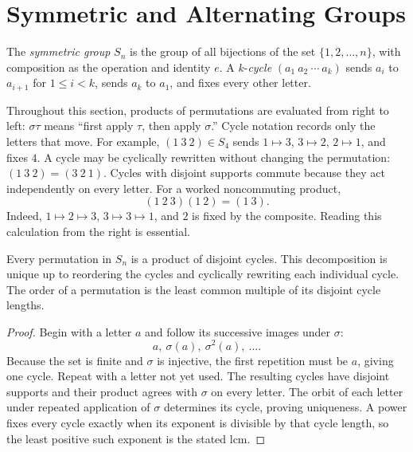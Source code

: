 \section{Symmetric and Alternating Groups}

\begin{definition}
The \emph{symmetric group} \(S_n\) is the group of all bijections of the set
\(\{1,2,\ldots,n\}\), with composition as the operation and identity \(e\).
A \(k\)-\emph{cycle}
\((a_1\ a_2\ \cdots\ a_k)\) sends \(a_i\) to \(a_{i+1}\) for
\(1\leq i<k\), sends \(a_k\) to \(a_1\), and fixes every other letter.
\end{definition}

Throughout this section, products of permutations are evaluated from right to
left: \(\sigma\tau\) means ``first apply \(\tau\), then apply \(\sigma\).''
Cycle notation records only the letters that move.  For example,
\((1\ 3\ 2)\in S_4\) sends \(1\mapsto3\), \(3\mapsto2\),
\(2\mapsto1\), and fixes \(4\).  A cycle may be cyclically rewritten without
changing the permutation: \((1\ 3\ 2)=(3\ 2\ 1)\).  Cycles with disjoint
supports commute because they act independently on every letter.  For a
worked noncommuting product,
\[
 (1\ 2\ 3)(1\ 2)=(1\ 3).
\]
Indeed, \(1\mapsto2\mapsto3\), \(3\mapsto3\mapsto1\), and \(2\) is fixed
by the composite.  Reading this calculation from the right is essential.

\begin{proposition}
Every permutation in \(S_n\) is a product of disjoint cycles.  This
decomposition is unique up to reordering the cycles and cyclically rewriting
each individual cycle.  The order of a permutation is the least common
multiple of its disjoint cycle lengths.
\end{proposition}
\begin{proof}
Begin with a letter \(a\) and follow its successive images under \(\sigma\):
\[a,\ \sigma(a),\ \sigma^2(a),\ \ldots.\]
Because the set is finite and \(\sigma\)
is injective, the first repetition must be \(a\), giving one cycle.  Repeat
with a letter not yet used.  The resulting cycles have disjoint supports and
their product agrees with \(\sigma\) on every letter.  The orbit of each letter
under repeated application of \(\sigma\) determines its cycle, proving
uniqueness.  A power fixes every cycle exactly when its exponent is divisible
by that cycle length, so the least positive such exponent is the stated lcm.
\end{proof}

